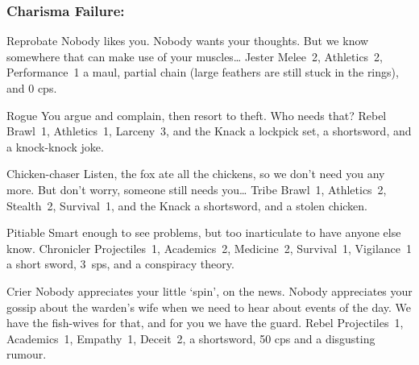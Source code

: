 \begin{multicols}{2}
\begin{itemize}
\end{itemize}

\needspace{10em}
\subsubsection{Charisma Failure:}

\begin{itemize}

  {Reprobate}%
  {Nobody likes you.
  Nobody wants your thoughts.
  But we know somewhere that can make use of your muscles\ldots
  }%
  {Jester}%
  {Melee~2, Athletics~2, Performance~1}%
  {a maul, partial chain (large feathers are still stuck in the rings), and 0 \glspl{cp}.}%

  {Rogue}%
  {You argue and complain, then resort to theft.
  Who needs that?
  }%
  {Rebel}%
  {Brawl~1, Athletics~1, Larceny~3, and the Knack \lucky}%
  {a lockpick set, a shortsword, and a knock-knock joke.}%

  {Chicken-chaser}%
  {Listen, the fox ate all the chickens, so we don't need you any more.
  But don't worry, someone still needs you\ldots
  }%
  {Tribe}%
  {Brawl~1, Athletics~2, Stealth~2, Survival~1, and the Knack \lucky}%
  {a shortsword, and a stolen chicken.}%

  {Pitiable}%
  {Smart enough to see problems, but too inarticulate to have anyone else know.
  }%
  {Chronicler}%
  {Projectiles~1, Academics~2, Medicine~2, Survival~1, Vigilance~1}%
  {a short sword, 3~\glspl{sp}, and a conspiracy theory.}%

  {Crier}%
  {Nobody appreciates your little `spin', on the news.
  Nobody appreciates your gossip about the warden's wife when we need to hear about events of the day.
  We have the fish-wives for that, and for you we have the \gls{guard}.
  }%
  {Rebel}%
  {Projectiles~1, Academics~1, Empathy~1, Deceit~2, }%
  {a shortsword, 50 \glspl{cp} and a disgusting rumour.}%

\end{itemize}

\end{multicols}

